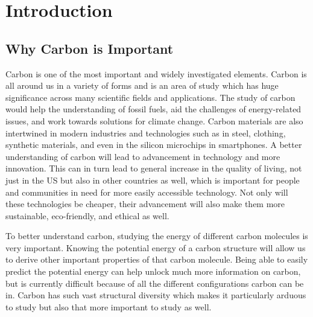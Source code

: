 \documentclass[12pt, abstract = true]{scrartcl}
\begin{document}
\newpage

\section{Introduction}\label{Introduction}

\subsection{Why Carbon is Important}

Carbon is one of the most important and widely investigated
elements. Carbon is all around us in a variety of forms and is an area
of study which has huge significance across many scientific fields and
applications. The study of carbon would help the understanding of 
fossil fuels, aid the challenges of energy-related issues, and work towards solutions for
climate change. Carbon materials are also intertwined in modern industries and technologies 
such as in steel, clothing, synthetic materials, and even in the silicon microchips in smartphones. 
A better understanding of carbon will lead to advancement in technology and more innovation. 
This can in turn lead to general increase in the quality of living, not just in the US but also 
in other countries as well, which is important for people and communities in need for more easily accessible technology. 
Not only will these technologies be cheaper, their advancement will also make 
them more sustainable, eco-friendly, and ethical as well.

To better understand carbon, studying the energy of different carbon molecules is very important. 
Knowing the potential energy of a carbon structure will allow us to derive other important properties 
of that carbon molecule. Being able to easily predict the potential energy can help unlock much more 
information on carbon, but is currently difficult because of all the different configurations carbon 
can be in. Carbon has such vast structural diversity which makes it particularly arduous to study but 
also that more important to study as well.
\end{document}
